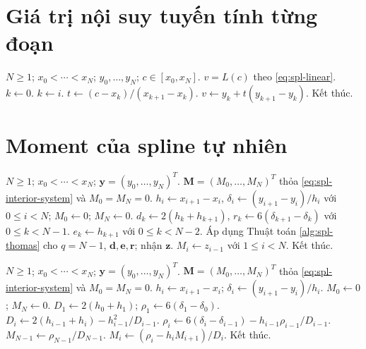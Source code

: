 \documentclass[12pt,a4paper,oneside]{book}
\numberwithin{algorithm}{chapter}
\theoremstyle{definition}
\begin{document}
\section{Giá trị nội suy tuyến tính từng đoạn}
\begin{algorithm}[H]
\caption{Nội suy tuyến tính tại một điểm}
\label{alg:spl-linear-evaluate}
\begin{algorithmic}[1]
\Require $N\geq1$; $x_0<\cdots<x_N$; $y_0,\ldots,y_N$; $c\in[x_0,x_N]$.
\Ensure $v=L(c)$ theo \eqref{eq:spl-linear}.
\State $k\gets0$.
    \State $k\gets i$.
  \EndIf
\EndFor
\Statex
\State $t\gets(c-x_k)/(x_{k+1}-x_k)$.
\State $v\gets y_k+t(y_{k+1}-y_k)$.
\State Kết thúc.
\end{algorithmic}
\end{algorithm}

\section{Moment của spline tự nhiên}
\begin{algorithm}[H]
\caption{Dựng moment của spline tự nhiên -- sơ lược}
\label{alg:spl-natural}
\begin{algorithmic}[1]
\Require $N\geq1$; $x_0<\cdots<x_N$; $\mathbf y=(y_0,\ldots,y_N)^T$.
\Ensure $\mathbf M=(M_0,\ldots,M_N)^T$ thỏa \eqref{eq:spl-interior-system} và $M_0=M_N=0$.
\State $h_i\gets x_{i+1}-x_i$, $\delta_i\gets(y_{i+1}-y_i)/h_i$ với $0\leq i<N$; $M_0\gets0$; $M_N\gets0$.
  \State $d_k\gets2(h_k+h_{k+1})$, $r_k\gets6(\delta_{k+1}-\delta_k)$ với $0\leq k<N-1$.
  \State $e_k\gets h_{k+1}$ với $0\leq k<N-2$.
  \State Áp dụng Thuật toán \ref{alg:spl-thomas} cho $q=N-1$, $\boldsymbol d,\boldsymbol e,\mathbf r$; nhận $\mathbf z$.
  \State $M_i\gets z_{i-1}$ với $1\leq i<N$.
\EndIf
\Statex
\State Kết thúc.
\end{algorithmic}
\end{algorithm}

\begin{algorithm}[H]
\caption{Dựng moment của spline tự nhiên -- chi tiết}
\label{alg:spl-natural-detailed}
\begin{algorithmic}[1]
\Require $N\geq1$; $x_0<\cdots<x_N$; $\mathbf y=(y_0,\ldots,y_N)^T$.
\Ensure $\mathbf M=(M_0,\ldots,M_N)^T$ thỏa \eqref{eq:spl-interior-system} và $M_0=M_N=0$.
  \State $h_i\gets x_{i+1}-x_i$; $\delta_i\gets(y_{i+1}-y_i)/h_i$.
\EndFor
\Statex
\State $M_0\gets0$; $M_N\gets0$.
  \State $D_1\gets2(h_0+h_1)$; $\rho_1\gets6(\delta_1-\delta_0)$.
    \State $D_i\gets2(h_{i-1}+h_i)-h_{i-1}^2/D_{i-1}$.
    \State $\rho_i\gets6(\delta_i-\delta_{i-1})-h_{i-1}\rho_{i-1}/D_{i-1}$.
  \EndFor
  \Statex
  \State $M_{N-1}\gets\rho_{N-1}/D_{N-1}$.
    \State $M_i\gets(\rho_i-h_iM_{i+1})/D_i$.
  \EndFor
\EndIf
\Statex
\State Kết thúc.
\end{algorithmic}
\end{algorithm}
\end{document}
